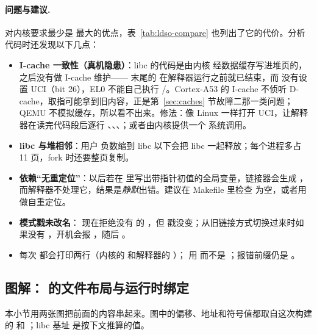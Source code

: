 \paragraph{问题与建议.} 对内核要求最少是  最大的优点，表~\ref{tab:ldso-compare} 也列出了它的代价。分析代码时还发现以下几点：

\begin{itemize}
  \item \textbf{I-cache 一致性（真机隐患）}：libc 的代码是由内核  经数据缓存写进堆页的，之后没有做 I-cache 维护—— 末尾的  在解释器运行之前就已结束，而  没有设置 UCI（bit 26），EL0 不能自己执行 /。Cortex-A53 的 I-cache 不侦听 D-cache，取指可能拿到旧内容，正是第~\ref{sec:caches} 节故障二那一类问题；QEMU 不模拟缓存，所以看不出来。修法：像 Linux 一样打开 UCI，让解释器在读完代码段后逐行 、、、；或者由内核提供一个  系统调用。
  \item \textbf{libc 与堆相邻}：用户  负数缩到 libc 以下会把 libc 一起释放；每个进程多占 11 页，fork 时还要整页复制。
  \item \textbf{依赖“无重定位”}：以后若在  里写出带指针初值的全局变量，链接器会生成 ，而解释器不处理它，结果是\emph{静默}出错。建议在 Makefile 里检查  为空，或者用  做自重定位。
  \item \textbf{模式戳未改名}： 现在拒绝没有  的 ，但  戳没变；从旧链接方式切换过来时如果没有 ，开机会报 ，随后 。
  \item 每次  都会打印两行（内核的  和解释器的 ）； 用  而不是 ；报错前缀仍是 。
\end{itemize}

\subsection{图解： 的文件布局与运行时绑定}
\label{sec:echo-figs}

本小节用两张图把前面的内容串起来。图中的偏移、地址和符号值都取自这次构建的  和 ；libc 基址  是按下文推算的值。

